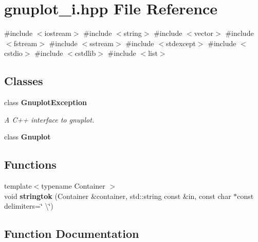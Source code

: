 \section{gnuplot\+\_\+i.\+hpp File Reference}
\label{gnuplot__i_8hpp}
{\ttfamily \#include $<$iostream$>$}\newline
{\ttfamily \#include $<$string$>$}\newline
{\ttfamily \#include $<$vector$>$}\newline
{\ttfamily \#include $<$fstream$>$}\newline
{\ttfamily \#include $<$sstream$>$}\newline
{\ttfamily \#include $<$stdexcept$>$}\newline
{\ttfamily \#include $<$cstdio$>$}\newline
{\ttfamily \#include $<$cstdlib$>$}\newline
{\ttfamily \#include $<$list$>$}\newline
\subsection*{Classes}
\begin{DoxyCompactItemize}
\item 
class \textbf{ Gnuplot\+Exception}
\begin{DoxyCompactList}\small\item\em A C++ interface to gnuplot. \end{DoxyCompactList}\item 
class \textbf{ Gnuplot}
\end{DoxyCompactItemize}
\subsection*{Functions}
\begin{DoxyCompactItemize}
\item 
{\footnotesize template$<$typename Container $>$ }\\void \textbf{ stringtok} (Container \&container, std\+::string const \&in, const char $\ast$const delimiters=\char`\"{} \textbackslash{}\char`\"{})
\end{DoxyCompactItemize}


\subsection{Function Documentation}
\mbox{\label{gnuplot__i_8hpp_aa638112596d8394216cd0954f18fb676}} 
